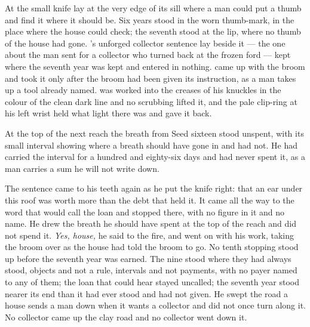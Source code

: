 \scenebreak

At  the small knife lay at the very edge of its sill where a man could put a thumb and find it where it should be. Six years stood in the worn thumb-mark, in the place where the house could check; the seventh stood at the lip, where no thumb of the house had gone. 's unforged collector sentence lay beside it --- the one about the man sent for a collector who turned back at the frozen ford --- kept where the seventh year was kept and entered in nothing.  came up with the broom and took it only after the broom had been given its instruction, as a man takes up a tool already named.  was worked into the creases of his knuckles in the colour of the clean dark line and no scrubbing lifted it, and the pale clip-ring at his left wrist held what light there was and gave it back.

At the top of the next reach the breath from Seed sixteen stood unspent, with its small interval showing where a breath should have gone in and had not. He had carried the interval for a hundred and eighty-six days and had never spent it, as a man carries a sum he will not write down.

The sentence came to his teeth again as he put the knife right: that an ear under this roof was worth more than the debt that held it. It came all the way to the word that would call the loan and stopped there, with no figure in it and no name. He drew the breath he should have spent at the top of the reach and did not spend it. \emph{Yes, house,} he said to the fire, and went on with his work, taking the broom over  as the house had told the broom to go. No tenth stopping stood up before the seventh year was earned. The nine stood where they had always stood, objects and not a rule, intervals and not payments, with no payer named to any of them; the loan that could hear stayed uncalled; the seventh year stood nearer its end than it had ever stood and had not given. He swept the road a house sends a man down when it wants a collector and did not once turn along it. No collector came up the clay road and no collector went down it.

\scenebreak

